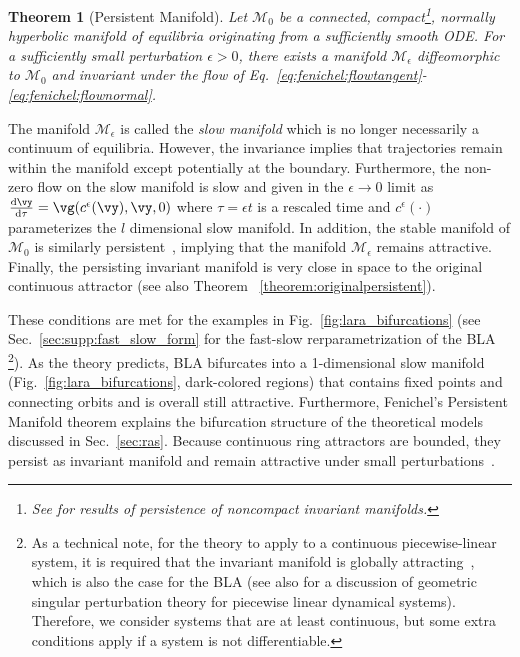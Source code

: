 \documentclass{article} %
\newcommand{\pscomment}[1]{\textcolor{BurntOrange}{(#1)}}
\newcounter{ct}
\newcommand{\dm}[1]{\ensuremath{\mathrm{d}{#1}}} %
\newcommand{\RN}[2]{\frac{\dm{#1}}{\dm{#2}}} %
\newcommand{\manifold}{\mathcal{M}}
\newtheorem{theorem}{Theorem}
\theoremstyle{definition}
\theoremstyle{remark}
\renewcommand{\cite}{\citep}
\begin{document}
\setlength\belowcaptionskip{2ex}

\begin{theorem}[Persistent Manifold]\label{theorem:persistent}
Let \(\manifold_{0}\) be a connected, compact\footnote{See \citep{eldering2013normally} for results of persistence of noncompact invariant manifolds.}, normally hyperbolic manifold of equilibria originating from a sufficiently smooth ODE.
For a sufficiently small perturbation \(\epsilon > 0\), there exists a manifold \(\manifold_{\epsilon}\) diffeomorphic to \(\manifold_{0}\) and  invariant under the flow of Eq.~\eqref{eq:fenichel:flowtangent}-\eqref{eq:fenichel:flownormal}. %
\end{theorem}

The manifold \(\manifold_{\epsilon}\) is called the \emph{slow manifold} which is no longer necessarily a continuum of equilibria.
However, the  invariance implies that trajectories remain within the manifold except potentially at the boundary. %
Furthermore, the non-zero flow on the slow manifold is slow and given in the \(\epsilon \to 0\) limit as \(\RN{\vy}{\tau} = \vg(c^{\epsilon}(\vy), \vy, 0)\) where \(\tau = \epsilon t\) is a rescaled time and \(c^{\epsilon}(\cdot)\) parameterizes the \(l\) dimensional slow manifold.
In addition, the stable manifold of \(\manifold_{0}\) is similarly persistent~\cite{Jones1995}, implying that the manifold \(\manifold_{\epsilon}\) remains attractive.
Finally, the persisting invariant manifold is very close in space to the original continuous attractor (see also Theorem ~\ref{theorem:originalpersistent}).


These conditions are met for the examples in Fig.~\ref{fig:lara_bifurcations} (see Sec.~\ref{sec:supp:fast_slow_form} for the fast-slow rerparametrization of the BLA
	\footnote{As a technical note, for the theory to apply to a continuous piecewise-linear system, it is required that the invariant manifold is globally attracting~\cite{simpson2018}, which is also the case for the BLA (see also \citep{prohens2013canard,prohens2016slow} for a discussion of geometric singular perturbation theory for piecewise linear dynamical systems). Therefore, we consider systems that are at least continuous, but some extra conditions apply if a system is not differentiable.}). %
As the theory predicts, BLA bifurcates into a 1-dimensional slow manifold (Fig.~\ref{fig:lara_bifurcations}, dark-colored regions) that contains fixed points and connecting orbits and is overall still attractive.
Furthermore, Fenichel's Persistent Manifold theorem explains the bifurcation structure of the theoretical models discussed in Sec.~\ref{sec:ras}.
Because continuous ring attractors are bounded, they persist as invariant manifold and remain attractive under small perturbations~\citep{wiggins1994}.
\end{document}
